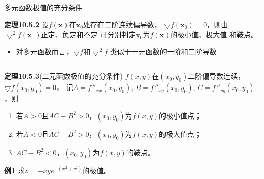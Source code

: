 \begin{frame}{多元函数极值的充分条件}
	\linespread{1.2}\pause 
	\begin{block}{{\bf 定理10.5.2}\hfill}
		设$f(\bm{x})$在$\bm{x}_0$处存在二阶连续偏导数，
		$\bigtriangledown f(\bm{x}_0)=0$，则由
		$\bigtriangledown^2 f(\bm{x}_0)$正定、负定和不定
		可分别判定$\bm{x}_0$为$f(\bm{x})$的极小值、极大值
		和鞍点。\pause 
	\end{block}
	\begin{itemize}
	  \item 对多元函数而言，$\bigtriangledown f$和$\bigtriangledown^2 f$
	  类似于一元函数的一阶和二阶导数\pause 
	\end{itemize}
	\hrule
	\bigskip
	\centerline{}
\end{frame}

\begin{frame}
	\linespread{1.2}
	\begin{block}{{\bf 定理10.5.3}(二元函数极值的充分条件)\hfill}
		$f(x,y)$在$(x_0,y_0)$二阶偏导数连续，$\bigtriangledown f(x_0,y_0)=0$，
		记$A=f\,''_{xx}(x_0,y_0),\,B=f\,''_{xy}(x_0,y_0),\,C=f\,''_{yy}(x_0,y_0)$，则
		\begin{enumerate}
		  \item 若$A>0$且$AC-B^2>0$，$(x_0,y_0)$为$f(x,y)$的极小值点；
		  \item 若$A<0$且$AC-B^2>0$，$(x_0,y_0)$为$f(x,y)$的极大值点；
		  \item $AC-B^2<0$，$(x_0,y_0)$为$f(x,y)$的鞍点。
		\end{enumerate}
	\end{block}
\end{frame}

\begin{frame}
	\linespread{1.2}
	\begin{exampleblock}{{\bf 例1}\hfill}
		求$z=-xye^{-(x^2+y^2)}$的极值。
	\end{exampleblock}\pause 
	\begin{center}
	\end{center}
\end{frame}

